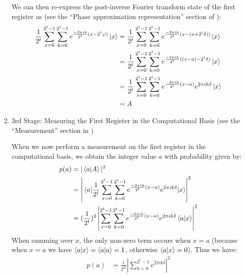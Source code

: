 \documentclass{article}
\begin{document}
\begin{enumerate}[label=\textbf{(\arabic*)}]
We can then re-express the post-inverse Fourier transform state of the first register as (see the ``Phase approximation representation'' section of \cite{wikipedia:qpe}):
\begin{align}
    \frac{1}{2^t}
      \sum_{x=0}^{2^t-1}
      \sum_{k=0}^{2^t-1}
      e^{\frac{-2\pi i k}{2^t}(x-2^{t}\varphi)} \ket{x}
    &=
    \frac{1}{2^t}
      \sum_{x=0}^{2^t-1}
      \sum_{k=0}^{2^t-1}
      e^{\frac{-2\pi i k}{2^t}(x-(a+2^{t}\delta))} \ket{x}\\
    &=
    \frac{1}{2^t}
      \sum_{x=0}^{2^t-1}
      \sum_{k=0}^{2^t-1}
      e^{\frac{-2\pi i k}{2^t}((x-a)-2^{t}\delta)} \ket{x}\\
    &=
    \frac{1}{2^t}
      \sum_{x=0}^{2^t-1}
      \sum_{k=0}^{2^t-1}
      e^{\frac{-2\pi i k}{2^t}(x-a)}
      e^{2\pi i k\delta}
      \ket{x}\\
    &=
    A
\end{align}


\item 3rd Stage: Measuring the First Register in the Computational Basis (see the ``Measurement'' section in \cite{wikipedia:qpe})

\vspace{0.1in}

When we now perform a measurement on the first register in the computational basis, we obtain the integer value $a$ with probability given by:
\begin{align}
    p(a)
    &=
    |\braket{a}{A}|^{2}\\
    &=
    \left|\matrixel{a}{\frac{1}{2^t}
      \sum_{x=0}^{2^t-1}
      \sum_{k=0}^{2^t-1}
      e^{\frac{-2\pi i k}{2^t}(x-a)}
      e^{2\pi i k\delta}}{x}\right|^{2}\\
    &=
    (\frac{1}{2^t})^2
    \left|
      \sum_{x=0}^{2^t-1}
      \sum_{k=0}^{2^t-1}
      e^{\frac{-2\pi i k}{2^t}(x-a)}
      e^{2\pi i k\delta}\bra{a}\ket{x}
    \right|^{2}
\end{align}
When summing over $x$, the only non-zero term occurs when $x=a$ (because when $x=a$ we have $\bra{a}\ket{x}=\bra{a}\ket{a}=1$, otherwise $\bra{a}\ket{x} = 0$). Thus we have:
\begin{align}
    p(a)
    &=
    \frac{1}{2^{2t}}
    \left|
      \sum_{k=0}^{2^t-1}
      e^{2\pi i k\delta}
    \right|^{2}
\end{align}


\end{enumerate}
\end{document}
